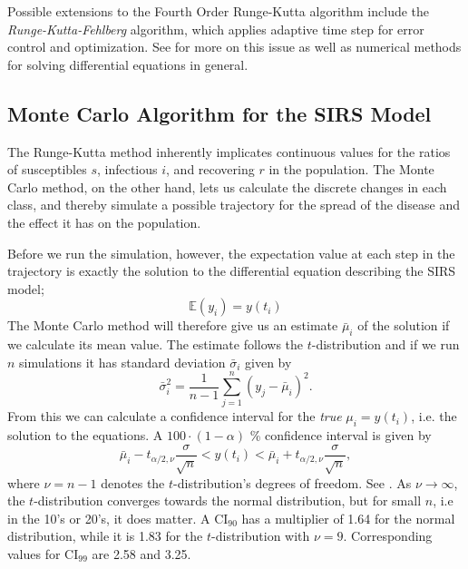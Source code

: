 \documentclass[]{article}
\begin{document}
Possible extensions to the Fourth Order Runge-Kutta algorithm include the \textit{Runge-Kutta-Fehlberg} algorithm, which applies adaptive time step for error control and optimization. See \cite{fys4150-notes} for more on this issue as well as numerical methods for solving differential equations in general.

\subsection{Monte Carlo Algorithm for the SIRS Model} \label{sec:monte-carlo}
The Runge-Kutta method inherently implicates continuous values for the ratios of susceptibles $s$, infectious $i$, and recovering $r$ in the population. The Monte Carlo method, on the other hand, lets us calculate the discrete changes in each class, and thereby simulate a possible trajectory for the spread of the disease and the effect it has on the population. 

Before we run the simulation, however, the expectation value at each step in the trajectory is exactly the solution to the differential equation describing the SIRS model;
\begin{equation}
	\mathbb{E}(y_i) = y(t_i)
\end{equation}
The Monte Carlo method will therefore give us an estimate $\bar{\mu}_i$ of the solution if we calculate its mean value. The estimate follows the $t$-distribution and if we run $n$ simulations it has standard deviation $\bar{\sigma}_i$ given by
\begin{equation}
	\bar{\sigma}_i^2 = \frac{1}{n-1} \sum_{j=1}^{n} (y_j - \bar{\mu}_i)^2.
\end{equation}
From this we can calculate a confidence interval for the \textit{true} $\mu_i = y(t_i)$, i.e. the solution to the equations. A $100 \cdot (1-\alpha)$ \% confidence interval is given by
\begin{equation}
	\bar{\mu}_i - t_{\alpha/2, \nu} \frac{\sigma}{\sqrt{n}} < y(t_i) < \bar{\mu}_i + t_{\alpha/2, \nu} \frac{\sigma}{\sqrt{n}},
\end{equation}
where $\nu = n-1$ denotes the $t$-distribution's degrees of freedom. See \cite{devore2012}. As $\nu \rightarrow \infty$, the $t$-distribution converges towards the normal distribution, but for small $n$, i.e in the 10's or 20's, it does matter. A CI$_{90}$ has a multiplier of 1.64 for the normal distribution, while it is 1.83 for the $t$-distribution with $\nu=9$. Corresponding values for CI$_{99}$ are 2.58 and 3.25.
\end{document}
